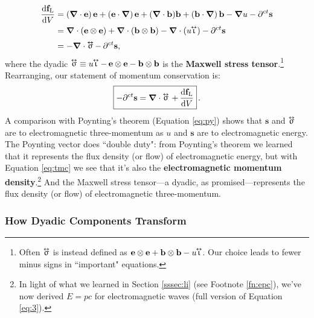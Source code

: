 \documentclass[12pt]{article}
\renewcommand{\vv}[1]{\mathbf{#1}}
\newcommand{\dd}[1]{\mathrm{d}#1}
\newcommand{\del}{\boldsymbol{\nabla}}
\newcommand{\tightoverset}[2]{%
  \mathop{#2}\limits^{\vbox to -.5ex{\kern-0.75ex\hbox{$#1$}\vss}}}
\newcommand{\inlinedy}[1]{\tightoverset{\text{\tiny$\bm\leftrightarrow$}}{#1}}
\begin{document}
\begin{equation*}
\begin{aligned}
\dfrac{\dd \vv f_{\mathrm{L}}}{\dd V} &= \left( \del \cdot \vv e \right) \vv e + \left( \vv e \cdot \del \right) \vv e + (\del \cdot \vv b) \vv b + \left( \vv b \cdot \del \right) \vv b - \del u - \partial^{ct} \vv s \\
&= \del \cdot (\vv e \otimes \vv e) + \del \cdot (\vv b \otimes \vv b) - \del \cdot (u \mkern-4.5mu \inlinedy{\upiota}) - \partial^{ct} \vv s \\[2pt]
&= - \del \cdot \inlinedy{\upsigma} - \, \partial^{ct} \vv s ,
\end{aligned}
\end{equation*}
where the dyadic $\inlinedy{\upsigma} \equiv u \mkern-4.5mu \inlinedy{\upiota} - \, \vv e \otimes \vv e - \vv b \otimes \vv b$ is the \textbf{Maxwell stress tensor}.\footnote{Often $\inlinedy{\upsigma}$ is instead defined as $\vv e \otimes \vv e + \vv b \otimes \vv b - u \mkern-4.5mu \inlinedy{\upiota}$. Our choice leads to fewer minus signs in ``important" equations.} Rearranging, our statement of momentum conservation is:
\begin{equation}\label{eq:tmc}
\boxed{ - \partial^{ct} \vv s = \del \cdot \inlinedy{\upsigma} \, + \, \dfrac{\dd \vv f_{\mathrm{L}}}{\dd V} } \, .
\end{equation}
A comparison with Poynting's theorem (Equation \ref{eq:py}) shows that $\vv s$ and $\inlinedy{\upsigma}$ are to electromagnetic three-momentum as $u$ and $\vv s$ are to electromagnetic energy. The Poynting vector does ``double duty": from Poynting's theorem we learned that it represents the flux density (or flow) of electromagnetic energy, but with Equation \ref{eq:tmc} we see that it's also the \textbf{electromagnetic momentum density}.\footnote{In light of what we learned in Section \ref{sssec:li} (see Footnote \ref{fn:epc}), we've now derived $E = pc$ for electromagnetic waves (full version of Equation \ref{eq:3}).} And the Maxwell stress tensor---a dyadic, as promised---represents the flux density (or flow) of electromagnetic three-momentum.

\subsubsection{How Dyadic Components Transform}
\end{document}
